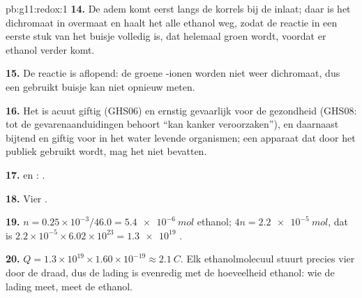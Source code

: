 \begin{solution}{pb:g11:redox:1}
\textbf{14.} De adem komt eerst langs de korrels bij de inlaat; daar is
het dichromaat in overmaat en haalt het alle ethanol weg, zodat de
reactie in een eerste stuk van het buisje volledig is, dat helemaal groen
wordt, voordat er ethanol verder komt.

\textbf{15.} De reactie is aflopend: de groene -ionen worden
niet weer dichromaat, dus een gebruikt buisje kan niet opnieuw meten.

\textbf{16.} Het is acuut giftig (GHS06) en ernstig gevaarlijk voor de
gezondheid (GHS08: tot de gevarenaanduidingen behoort ``kan kanker
veroorzaken''), en daarnaast bijtend en giftig voor in het water levende
organismen; een apparaat dat door het publiek gebruikt wordt, mag het
niet bevatten.

\textbf{17.}  en
:
.

\textbf{18.} Vier .

\textbf{19.} $n = 0.25\times 10^{-3}/46.0 = \qty{5.4e-6}{mol}$
ethanol;  $4n = \qty{2.2e-5}{mol}$, dat is
$2.2\times 10^{-5}\times 6.02\times 10^{23} = \num{1.3e19}$ .

\textbf{20.} $Q = 1.3\times 10^{19}\times 1.60\times 10^{-19} \approx
\qty{2.1}{C}$. Elk ethanolmolecuul stuurt precies vier  door
de draad, dus de lading is evenredig met de hoeveelheid ethanol: wie de
lading meet, meet de ethanol.
\end{solution}
